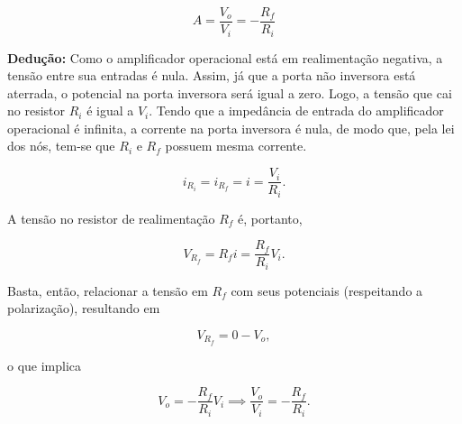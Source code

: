 \documentclass{article}
\numberwithin{equation}{section}
\newcommand{\curtovirtual}{($(opamp.+)+(0.3,0)$) to[open,v^=$ $, l=0, voltage shift=1] ($(opamp.-)+(0.3,0)$)}
\let\dfr\dfrac
\begin{document}
\begin{equation}
    A=\frac{V_{o}}{V_{i}}=-\frac{R_{f}}{R_{i}}  \label{eq:ampop_inversor}
\end{equation}

\textbf{Dedução:} Como o amplificador operacional está em realimentação negativa, a tensão entre sua entradas é nula. Assim, já que a porta não inversora está aterrada, o potencial na porta inversora será igual a zero. Logo, a tensão que cai no resistor $R_i$ é igual a $V_i$. Tendo que a impedância de entrada do amplificador operacional é infinita, a corrente na porta inversora é nula, de modo que, pela lei dos nós, tem-se que $R_i$ e $R_f$ possuem mesma corrente.

\begin{center}
\end{center}

\begin{equation*}
    i_{R_i} = i_{R_f} = i = \dfr{V_i}{R_i}.
\end{equation*}

\noindent A tensão no resistor de realimentação $R_f$ é, portanto,

\begin{equation*}
    V_{R_f} = R_f i = \dfr{R_f}{R_i} V_i.
\end{equation*}

\noindent Basta, então, relacionar a tensão em $R_f$ com seus potenciais (respeitando a polarização), resultando em

\begin{equation*}
    V_{R_f} = 0 - V_o,
\end{equation*}

\noindent o que implica

\begin{equation*}
    V_o = -\dfr{R_f}{R_i} V_i \implies \dfr{V_o}{V_i} = -\dfr{R_f}{R_i}.
\end{equation*}
\end{document}
